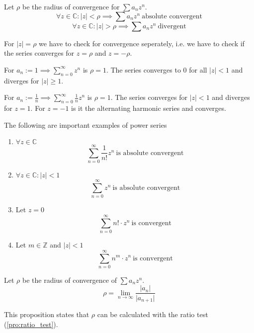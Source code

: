 \begin{theorem}\label{thm:conv_radius}
   Let \(\rho\) be the radius of convergence for \(\sum a_n z^n\).
   \[\forall z \in \mathbb{C}: \lvert z\rvert < \rho \implies \sum a_n z^n~\text{absolute convergent}\]
   \[\forall z \in \mathbb{C}: \lvert z\rvert > \rho \implies \sum a_n z^n~\text{divergent}\]
\end{theorem}
\begin{remark}
   For \(\lvert z\rvert = \rho\) we have to check for convergence seperately, i.e. we have to check if the series converges for \(z = \rho\) and \(z = -\rho\).
\end{remark}
\begin{example}
   For \(a_n := 1 \implies \sum_{n=0}^\infty z^n\) is \(\rho = 1\).
   The series converges to 0 for all \(|z| < 1\) and diverges for \(|z| \geq 1\).
\end{example}
\begin{example}
   For \(a_n := \frac{1}{n} \implies \sum_{n=0}^\infty \frac{1}{n} z^n\) is \(\rho = 1\).
   The series converges for \(|z| < 1\) and diverges for \(z = 1\).
   For \(z = -1\) is it the alternating harmonic series and converges.
\end{example}

\begin{proposition}
   The following are important examples of power series
   \begin{enumerate}[label=\roman*, align=Center]
      \item \(\forall z \in \mathbb{C}\)
         \[\sum_{n=0}^\infty \frac{1}{n!} z^n~\text{is absolute convergent}\]
      \item \(\forall z \in \mathbb{C}: \lvert z\rvert < 1\)
         \[\sum_{n=0}^\infty z^n~\text{is absolute convergent}\]
      \item Let \(z = 0\)
         \[\sum_{n=0}^\infty n! \cdot z^n~\text{is convergent}\]
      \item Let \(m \in \mathbb{Z}\) and \(\lvert z\rvert < 1\)
         \[\sum_{n=0}^\infty n^m \cdot z^n~\text{is convergent}\]
   \end{enumerate}
\end{proposition}

\begin{proposition}\label{pro:conv_rad_ratio_test}
   Let \(\rho\) be the radius of convergence of \(\sum a_n z^n\).
   \[\rho = \lim_{n \to \infty} \frac{\lvert a_n\rvert}{\lvert a_{n+1}\rvert}\]
\end{proposition}
\begin{remark}
   This proposition states that \(\rho\) can be calculated with the ratio test (\ref{pro:ratio_test}).
\end{remark}

